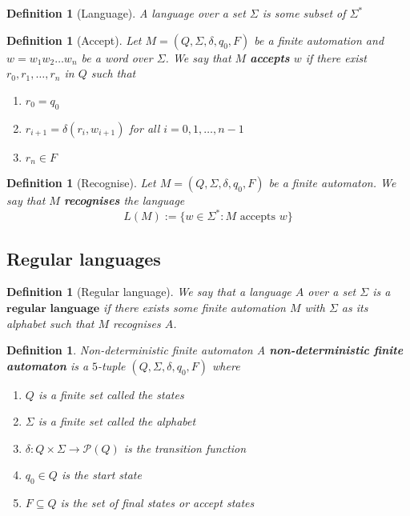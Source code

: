 \documentclass{article}
\theoremstyle{break}
\newtheorem{definition}[theorem]{Definition}
\begin{document}
\begin{definition}[Language]
A language over a set $\Sigma$ is some subset of $\Sigma^*$
\end{definition}

\begin{definition}[Accept]
\label{def:finite-automaton-accept}
Let $M=(Q,\Sigma,\delta,q_0,F)$ be a finite automation and $w = w_1w_2\ldots w_n$ be a word over $\Sigma$. 
We say that $M$ \textbf{accepts} $w$ if there exist $r_0, r_1, \ldots, r_n$ in $Q$ such that
\begin{enumerate}
  \item $r_0=q_0$
  \item $r_{i+1} = \delta(r_i, w_{i+1})$ for all $i = 0,1,\ldots, n-1$
  \item $r_n\in F$
\end{enumerate}
\end{definition}

\begin{definition}[Recognise]
\label{def:recognise}
Let $M=(Q,\Sigma,\delta,q_0,F)$ be a finite automaton.
We say that $M$ \textbf{recognises} the language 
\[L(M) := \{w \in \Sigma^*: M \text{ accepts } w\}\]
\end{definition}

\subsection{Regular languages}
\begin{definition}[Regular language]
\label{def:regular-language}
We say that a language $A$ over a set $\Sigma$ is a $\textbf{regular language}$ if there exists some finite automation $M$ with $\Sigma$ as its alphabet such that $M$ recognises $A$.
\end{definition}

\begin{definition}{Non-deterministic finite automaton}
\label{def:nondeterministic-finite-automaton}
A \textbf{non-deterministic finite automaton} is a $5$-tuple $(Q,\Sigma,\delta,q_0,F)$ where
\begin{enumerate}
    \item $Q$ is a finite set called the \textit{states}
    \item $\Sigma$ is a finite set called the \textit{alphabet}
    \item $\delta: Q\times\Sigma \to \mathcal{P}(Q)$ is the \textit{transition function}
    \item $q_0\in Q$ is the \textit{start state}
    \item $F \subseteq Q$ is the set of \textit{final states} or \textit{accept states} 
\end{enumerate}
\end{definition}
\end{document}
